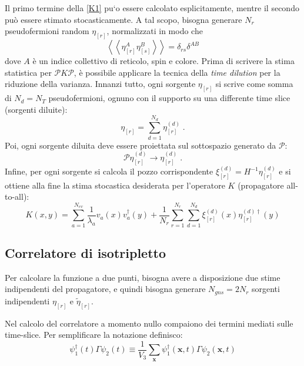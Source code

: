 \documentclass[a4paper]{article}
\newcommand{\point}{\; .}
\newcommand{\leftna}{\left< \right. \left< \right.}
\newcommand{\rightna}{\left. \right> \left. \right>}
\begin{document}
Il primo termine della \ref{K1} pu`{o} essere calcolato esplicitamente, mentre il secondo pu\`{o} essere stimato stocasticamente. A tal scopo, bisogna generare $N_r$ pseudofermioni random $\eta_{[r]}$, normalizzati in modo che
\begin{equation*}
\leftna \eta_{[r]}^A \eta_{[s]}^B \rightna = \delta_{rs} \delta^{AB}
\end{equation*}
dove $A$ \`{e} un indice collettivo di reticolo, spin e colore. Prima di scrivere la stima statistica per $\mathcal{P}K\mathcal{P}$, \`{e} possibile applicare la tecnica della \textit{time dilution} per la riduzione della varianza. Innanzi tutto, ogni sorgente $\eta_{[r]}$ si scrive come somma di $N_d = N_T$ pseudofermioni, ognuno con il supporto su una differente time slice (sorgenti diluite):
\begin{equation*}
\eta_{[r]} = \sum_{d=1}^{N_d} \eta_{[r]}^{(d)} \point
\end{equation*}
Poi, ogni sorgente diluita deve essere proiettata sul sottospazio generato da $\mathcal{P}$:
\begin{equation*}
\mathcal{P}\eta_{[r]}^{(d)} \rightarrow \eta_{[r]}^{(d)} \point
\end{equation*}
Infine, per ogni sorgente si calcola il pozzo corrispondente $\xi_{[r]}^{(d)} = H^{-1} \eta_{[r]}^{(d)}$ e si ottiene alla fine la stima stocastica desiderata per l'operatore $K$ (propagatore all-to-all):
\begin{equation} \label{K}
K(x,y) = \sum_{a=1}^{N_{ev}} \frac{1}{\lambda_a} v_a(x) v_a^\dagger(y) + \frac{1}{N_r} \sum_{r=1}^{N_r} \sum_{d=1}^{N_d} \xi_{[r]}^{(d)}(x) \eta_{[r]}^{(d)\dagger}(y)
\end{equation}



\subsection{Correlatore di isotripletto}

Per calcolare la funzione a due punti, bisogna avere a disposizione due stime indipendenti del propagatore, e quindi bisogna generare $N_{gns} = 2N_r$ sorgenti indipendenti $\eta_{[r]}$ e $\tilde{\eta}_{[r]}$.

Nel calcolo del correlatore a momento nullo compaiono dei termini mediati sulle time-slice. Per semplificare la notazione definisco:
\begin{equation*}
\psi^\dagger_1(t) \Gamma \psi_2(t) \equiv \frac{1}{V_3} \sum_{\mathbf{x}} \psi^\dagger_1(\mathbf{x},t) \Gamma \psi_2(\mathbf{x},t)
\end{equation*}
\end{document}
